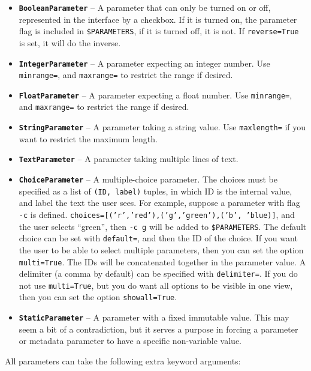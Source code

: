 \documentclass[a4paper,12pt]{report}
\begin{document}
\begin{itemize}
\item \textbf{\texttt{BooleanParameter}} -- A parameter that can only be turned on or off, represented in the interface by a checkbox. If it is turned on, the parameter flag is included in \texttt{\$PARAMETERS}, if it is turned off, it is not. If \texttt{reverse=True} is set, it will do the inverse.
\item \textbf{\texttt{IntegerParameter}} -- A parameter expecting an integer number. Use \texttt{minrange=}, and \texttt{maxrange=} to restrict the range if desired.
\item \textbf{\texttt{FloatParameter}} -- A parameter expecting a float number. Use \texttt{minrange=}, and \texttt{maxrange=} to restrict the range if desired.
\item \textbf{\texttt{StringParameter}} -- A parameter taking a string value. Use \texttt{maxlength=} if you want to restrict the maximum length.
\item \textbf{\texttt{TextParameter}} -- A parameter taking multiple lines of text. 
\item \textbf{\texttt{ChoiceParameter}} -- A multiple-choice parameter. The
  choices must be specified as a list of \texttt{(ID, label)} tuples, in which
  ID is the internal value, and label the text the user sees. For example,
  suppose a parameter with flag \texttt{-c} is defined.
  \texttt{choices=[('r','red'),('g','green'),('b', 'blue)]}, and the user
  selects ``green'', then  \texttt{-c g} will be added to
  \texttt{\$PARAMETERS}. The default choice can be set with \texttt{default=},
  and then the ID of the choice. If you want the user to be able to select
  multiple parameters, then you can set the option \texttt{multi=True}. The IDs
  will be concatenated together in the parameter value. A delimiter (a comma by
  default) can be specified with \texttt{delimiter=}. If you do not use
  \texttt{multi=True}, but you do want all options to be visible in one view,
  then you can set the option \texttt{showall=True}.
\item \textbf{\texttt{StaticParameter}} -- A parameter with a fixed immutable value. This may seem a bit of a contradiction, but it serves a purpose in forcing a parameter or metadata parameter to have a specific non-variable value.
\end{itemize}

All parameters can take the following extra keyword arguments:
\end{document}
